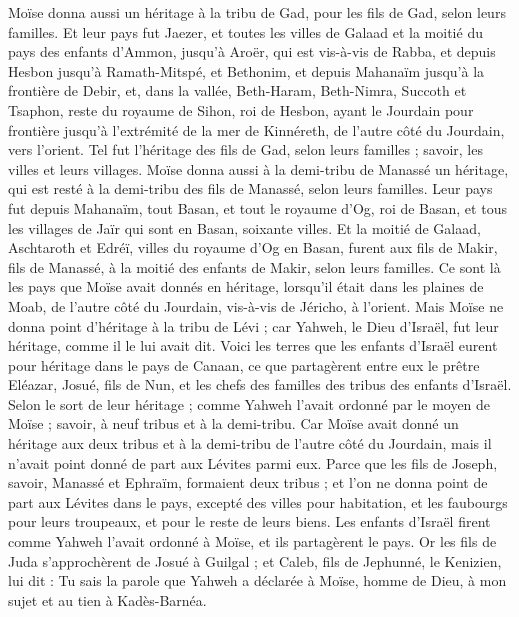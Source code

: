 \begin{multicols}{2}
Moïse donna aussi un héritage à la tribu de Gad, pour les fils de Gad, selon leurs familles.
Et leur pays fut Jaezer, et toutes les villes de Galaad et la moitié du pays des enfants d'Ammon, jusqu'à Aroër, qui est vis-à-vis de Rabba,
et depuis Hesbon jusqu'à Ramath-Mitspé, et Bethonim, et depuis Mahanaïm jusqu'à la frontière de Debir,
et, dans la vallée, Beth-Haram, Beth-Nimra, Succoth et Tsaphon, reste du royaume de Sihon, roi de Hesbon, ayant le Jourdain pour frontière jusqu'à l'extrémité de la mer de Kinnéreth, de l'autre côté du Jourdain, vers l'orient.
Tel fut l'héritage des fils de Gad, selon leurs familles ; savoir, les villes et leurs villages.
Moïse donna aussi à la demi-tribu de Manassé un héritage, qui est resté à la demi-tribu des fils de Manassé, selon leurs familles.
Leur pays fut depuis Mahanaïm, tout Basan, et tout le royaume d'Og, roi de Basan, et tous les villages de Jaïr qui sont en Basan, soixante villes.
Et la moitié de Galaad, Aschtaroth et Edréï, villes du royaume d'Og en Basan, furent aux fils de Makir, fils de Manassé, à la moitié des enfants de Makir, selon leurs familles.
Ce sont là les pays que Moïse avait donnés en héritage, lorsqu'il était dans les plaines de Moab, de l'autre côté du Jourdain, vis-à-vis de Jéricho, à l'orient.
Mais Moïse ne donna point d'héritage à la tribu de Lévi ; car Yahweh, le Dieu d'Israël, fut leur héritage, comme il le lui avait dit.
\VerseOne{}Voici les terres que les enfants d'Israël eurent pour héritage dans le pays de Canaan, ce que partagèrent entre eux le prêtre Eléazar, Josué, fils de Nun, et les chefs des familles des tribus des enfants d'Israël.
Selon le sort de leur héritage ; comme Yahweh l'avait ordonné par le moyen de Moïse ; savoir, à neuf tribus et à la demi-tribu.
Car Moïse avait donné un héritage aux deux tribus et à la demi-tribu de l'autre côté du Jourdain, mais il n'avait point donné de part aux Lévites parmi eux.
Parce que les fils de Joseph, savoir, Manassé et Ephraïm, formaient deux tribus ; et l'on ne donna point de part aux Lévites dans le pays, excepté des villes pour habitation, et les faubourgs pour leurs troupeaux, et pour le reste de leurs biens.
Les enfants d'Israël firent comme Yahweh l'avait ordonné à Moïse, et ils partagèrent le pays.
Or les fils de Juda s'approchèrent de Josué à Guilgal ; et Caleb, fils de Jephunné, le Kenizien, lui dit : Tu sais la parole que Yahweh a déclarée à Moïse, homme de Dieu, à mon sujet et au tien à Kadès-Barnéa.

\end{multicols}
